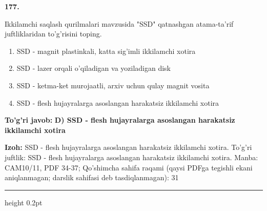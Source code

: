 \documentclass[10pt,a4paper]{article}
\begin{document}
{\bfseries\sffamily\color{ink} 177.}
\par
Ikkilamchi saqlash qurilmalari mavzusida "SSD" qatnashgan atama-ta'rif juftliklaridan to'g'risini toping.
\begin{enumerate}[label=\Alph*),leftmargin=9mm]
\item SSD - magnit plastinkali, katta sig'imli ikkilamchi xotira
\item SSD - lazer orqali o'qiladigan va yoziladigan disk
\item SSD - ketma-ket murojaatli, arxiv uchun qulay magnit vosita
\item SSD - flesh hujayralarga asoslangan harakatsiz ikkilamchi xotira
\end{enumerate}
\begin{tcolorbox}[enhanced,breakable,colback=teal!4,colframe=teal!60!black,boxrule=0.45pt,arc=1.2mm,left=2.7mm,right=2.7mm,top=1.8mm,bottom=1.8mm,before skip=2mm,after skip=2mm]
{\bfseries\sffamily\color{teal}To'g'ri javob:} \textbf{D) SSD - flesh hujayralarga asoslangan harakatsiz ikkilamchi xotira}
\par\smallskip
{\bfseries Izoh:} SSD - flesh hujayralarga asoslangan harakatsiz ikkilamchi xotira. To'g'ri juftlik: SSD - flesh hujayralarga asoslangan harakatsiz ikkilamchi xotira. Manba: CAM10/11, PDF 34-37; Qo'shimcha sahifa raqami (qaysi PDFga tegishli ekani aniqlanmagan; darslik sahifasi deb tasdiqlanmagan): 31
\end{tcolorbox}
\vspace{2mm}\hrule height 0.2pt\vspace{3mm}
\end{document}
